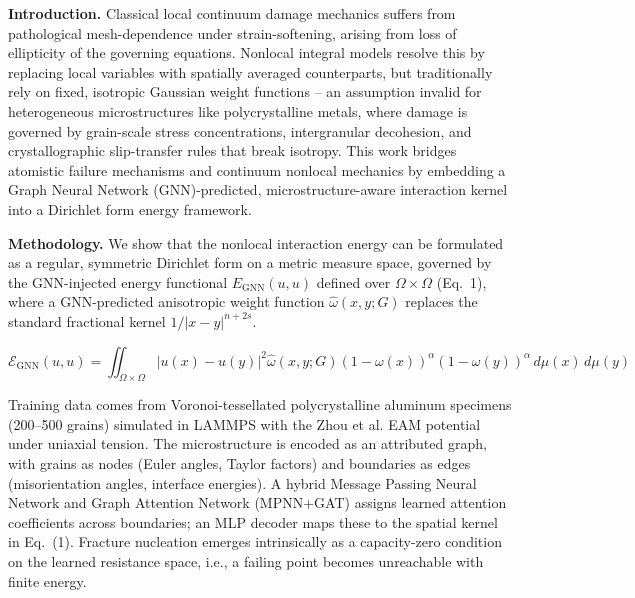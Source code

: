 \documentclass[12pt,a4paper]{article}
\begin{document}
\begingroup
\fontsize{12}{14.4}\selectfont
\justifying
\setlength{\parindent}{12.7mm}

\textbf{Introduction.} Classical local continuum damage mechanics suffers from pathological mesh-dependence under strain-softening, arising from loss of ellipticity of the governing equations. Nonlocal integral models resolve this by replacing local variables with spatially averaged counterparts, but traditionally rely on fixed, isotropic Gaussian weight functions -- an assumption invalid for heterogeneous microstructures like polycrystalline metals, where damage is governed by grain-scale stress concentrations, intergranular decohesion, and crystallographic slip-transfer rules that break isotropy. This work bridges atomistic failure mechanisms and continuum nonlocal mechanics by embedding a Graph Neural Network (GNN)-predicted, microstructure-aware interaction kernel into a Dirichlet form energy framework.\par

\textbf{Methodology.} We show that the nonlocal interaction energy can be formulated as a regular, symmetric Dirichlet form on a metric measure space, governed by the GNN-injected energy functional $E_{\text{GNN}}(u,u)$ defined over $\Omega \times \Omega$ (Eq.~1), where a GNN-predicted anisotropic weight function $\hat{\omega}(x,y;G)$ replaces the standard fractional kernel $1/|x-y|^{n+2s}$.

\begin{equation}
\mathcal{E}_{\text{GNN}}(u,u) = \iint_{\Omega \times \Omega} \left| u(x) - u(y) \right|^{2} \widehat{\omega}(x,y;G) \left( 1 - \omega(x) \right)^{\alpha} \left( 1 - \omega(y) \right)^{\alpha} \, d\mu(x)\, d\mu(y)
\end{equation}

Training data comes from Voronoi-tessellated polycrystalline aluminum specimens (200--500 grains) simulated in LAMMPS with the Zhou et al. EAM potential under uniaxial tension. The microstructure is encoded as an attributed graph, with grains as nodes (Euler angles, Taylor factors) and boundaries as edges (misorientation angles, interface energies). A hybrid Message Passing Neural Network and Graph Attention Network (MPNN+GAT) assigns learned attention coefficients across boundaries; an MLP decoder maps these to the spatial kernel in Eq.~(1). Fracture nucleation emerges intrinsically as a capacity-zero condition on the learned resistance space, i.e., a failing point becomes unreachable with finite energy.\par
\end{document}
